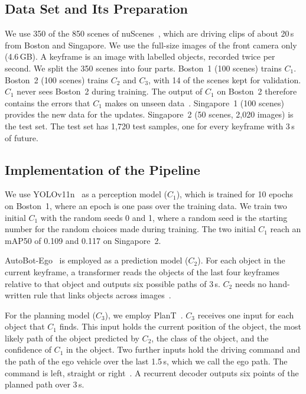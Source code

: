\documentclass[conference]{IEEEtran}
\begin{document}
\subsection{Data Set and Its Preparation}
We use 350 of the 850 scenes of nuScenes~\cite{caesar2020nuscenes}, which are driving clips of about 20\,s from Boston and Singapore. We use the full-size images of the front camera only (4.6\,GB). A keyframe is an image with labelled objects, recorded twice per second. We split the 350 scenes into four parts. Boston~1 (100 scenes) trains $C_1$. Boston~2 (100 scenes) trains $C_2$ and $C_3$, with 14 of the scenes kept for validation. $C_1$ never sees Boston~2 during training. The output of $C_1$ on Boston~2 therefore contains the errors that $C_1$ makes on unseen data~\cite{xu2024realworld}. Singapore~1 (100 scenes) provides the new data for the updates. Singapore~2 (50 scenes, 2{,}020 images) is the test set. The test set has 1{,}720 test samples, one for every keyframe with 3\,s of future.

\subsection{Implementation of the Pipeline}
We use YOLOv11n~\cite{jocher2024yolo11} as a perception model ($C_1$), which is trained for 10 epochs on Boston~1, where an epoch is one pass over the training data. We train two initial $C_1$ with the random seeds 0 and 1, where a random seed is the starting number for the random choices made during training. The two initial $C_1$ reach an mAP50 of 0.109 and 0.117 on Singapore~2.

AutoBot-Ego~\cite{girgis2022autobots} is employed as a prediction model ($C_2$). For each object in the current keyframe, a transformer reads the objects of the last four keyframes relative to that object and outputs six possible paths of 3\,s. $C_2$ needs no hand-written rule that links objects across images~\cite{weng2022whose}.

For the planning model ($C_3$), we employ PlanT~\cite{renz2022plant}. $C_3$ receives one input for each object that $C_1$ finds. This input holds the current position of the object, the most likely path of the object predicted by $C_2$, the class of the object, and the confidence of $C_1$ in the object. Two further inputs hold the driving command and the path of the ego vehicle over the last 1.5\,s, which we call the ego path. The command is left, straight or right~\cite{zhai2023rethinking}. A recurrent decoder outputs six points of the planned path over 3\,s.
\end{document}
